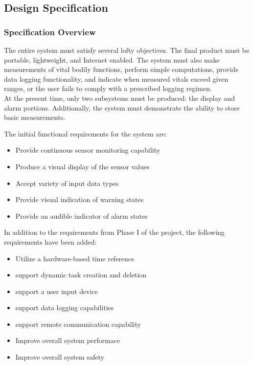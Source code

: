 \documentclass[12pt]{article} %
\begin{document}
\subsection{Design Specification\label{sec:designSpec}}

\subsubsection{Specification Overview}
The entire system must satisfy several lofty objectives. The final product must be portable, lightweight, and Internet enabled. The system must also make measurements of vital bodily functions, perform simple computations, provide data logging functionality, and indicate when measured vitals exceed given ranges, or the user fails to comply with a prescribed logging regimen. \\
At the present time, only two subsystems must be produced: the display and alarm portions. Additionally, the system must demonstrate the ability to store basic measurements. \\

\begin{itemize}[$$]
  \item The initial functional requirements for the system are:
    \begin{itemize}[$\bullet$]
      \item Provide continuous sensor monitoring capability
      \item Produce a visual display of the sensor values
      \item Accept variety of input data types
      \item Provide visual indication of warning states
      \item Provide an audible indicator of alarm states
    \end{itemize}
  \item In addition to the requirements from Phase I of the project, the following requirements have been added:
    \begin{itemize}[$\bullet$]
      \item Utilize a hardware-based time reference
      \item support dynamic task creation and deletion
      \item support a user input device
      \item support data logging capabilities
      \item support remote communication capability
      \item Improve overall system performace
      \item Improve overall system safety
    \end{itemize}
\end{itemize}
\end{document}
